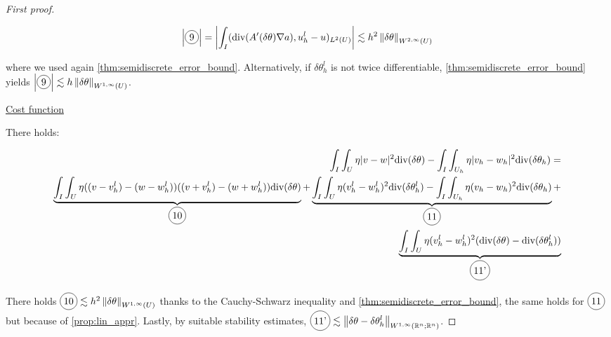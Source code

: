 \documentclass[english,a4paper,9pt,oneside]{scrbook}	%
\theoremstyle{break}
\newenvironment{mproof}[1][\proofname]{%
  \begin{proof}[#1]$ $\par\nobreak\ignorespaces
}{%
  \end{proof}
}
\renewcommand*{\proofname}{Proof}
\theoremstyle{remark}
\newcommand{\mR}{\mathbb{R}}
\newcommand{\ds}{\displaystyle}
\newcommand{\norm}[1]{\left\lVert#1\right\rVert}
\newcommand{\te}{\theta}
\newcommand{\dive}{\text{div}}
\newcommand*\circled[1]{\tikz[baseline=(char.base)]{
            \node[shape=circle,draw,inner sep=2pt] (char) {#1};}}
\begin{document}
\begin{mproof}[First proof]
\begin{align*}
	\left |\circled{9} \right |= \left |\int_I(\dive(A'(\delta \te)\nabla a), u_h^l-u)_{L^2(U)}\right |\lesssim h^2 \norm{\delta \te}_{W^{2,\infty}(U)}
\end{align*}

where we used again \cref{thm:semidiscrete_error_bound}. Alternatively, if $\delta \te_h^l$ is not twice differentiable, \cref{thm:semidiscrete_error_bound} yields $\ds \left |\circled{9} \right |\lesssim h \norm{\delta \te}_{W^{1,\infty}(U)}$.

\underline{Cost function}

There holds:

\begin{align*}
	\int_I \int_U \eta |v-w|^2 \dive(\delta \te) - \int_I \int_{U_h} \eta |v_h-w_h|^2\dive(\delta \te_h)=\\
	\underbrace{\int_I\int_U\eta((v-v_h^l)-(w-w_h^l))((v+v_h^l)-(w+w_h^l))\dive(\delta \te)}_{\circled{10}} + \underbrace{\int_I\int_U\eta(v_h^l-w_h^l)^2\dive(\delta \te_h^l)-\int_I\int_{U_h}\eta (v_h-w_h)^2\dive(\delta \te_h)}_{\circled{11}}+\\
	\underbrace{\int_I\int_U\eta(v_h^l-w_h^l)^2(\dive(\delta \te)-\dive(\delta \te_h^l))}_{\circled{11'}}	
\end{align*}

There holds $\circled{10} \lesssim h^2\norm{\delta \te}_{W^{1,\infty}(U)}$ thanks to the Cauchy-Schwarz inequality and \cref{thm:semidiscrete_error_bound}, the same holds for $\circled{11}$ but because of \cref{prop:lin_appr}. Lastly, by suitable stability estimates, $\ds \circled{11'} \lesssim \norm{\delta \te - \delta \te_h^l}_{W^{1,\infty}(\mR^n; \mR^n)}$. 
\end{mproof}
\end{document}

